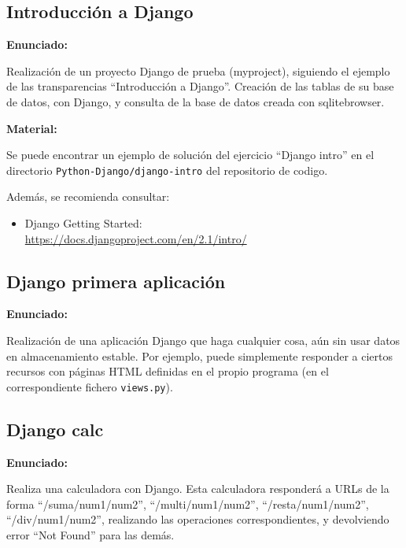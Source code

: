 \subsection{Introducción a Django}
\label{subsec:django-intro}

\textbf{Enunciado:}

Realización de un proyecto Django de prueba (myproject), siguiendo el ejemplo de las transparencias ``Introducción a Django''. Creación de las tablas de su base de datos, con Django, y consulta de la base de datos creada con sqlitebrowser.

\textbf{Material:}

Se puede encontrar un ejemplo de solución del ejercicio ``Django intro'' en el directorio \verb|Python-Django/django-intro| del repositorio de codigo.

Además, se recomienda consultar:

\begin{itemize}
\item Django Getting Started: \\
  \url{https://docs.djangoproject.com/en/2.1/intro/}
\end{itemize}

\subsection{Django primera aplicación}
\label{subsec:django-primera}

\textbf{Enunciado:}

Realización de una aplicación Django que haga cualquier cosa, aún sin usar datos en almacenamiento estable. Por ejemplo, puede simplemente responder a ciertos recursos con páginas HTML definidas en el propio programa (en el correspondiente fichero \texttt{views.py}).

\subsection{Django calc}
\label{subsec:django-calc}

\textbf{Enunciado:}

Realiza una calculadora con Django. Esta calculadora responderá a URLs de la forma ``/suma/num1/num2'', ``/multi/num1/num2'', ``/resta/num1/num2'', ``/div/num1/num2'', realizando las operaciones correspondientes, y devolviendo error ``Not Found'' para las demás.

